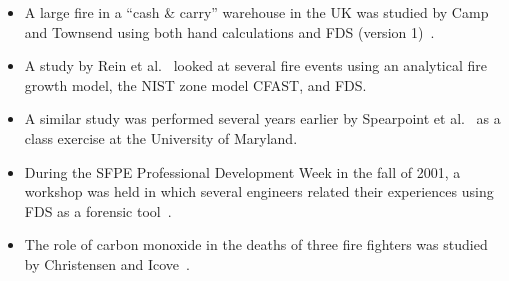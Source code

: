 \begin{itemize}
\item A large fire in a ``cash \& carry'' warehouse in the UK was studied by Camp and Townsend using both hand calculations and FDS (version 1)~\cite{Camp:Interflam2001}.
\item A study by Rein et al.~\cite{Rein:Interflam2004} looked at several fire events using an analytical fire growth model, the NIST zone model CFAST, and FDS.
\item A similar study was performed several years earlier by Spearpoint et al.~\cite{Spearpoint:ICFRE3} as a class exercise at the University of Maryland.
\item During the SFPE Professional Development Week in the fall of 2001, a workshop was held in which several engineers related their experiences using FDS as a forensic tool~\cite{Carpenter:SFPE2001}.
\item The role of carbon monoxide in the deaths of three fire fighters was studied by Christensen and Icove~\cite{Christensen:JFS}.
\end{itemize}
